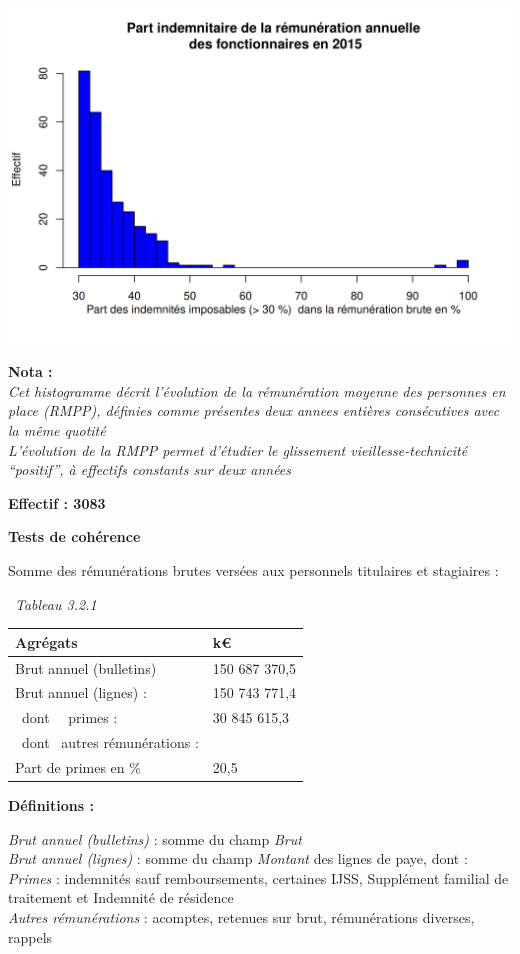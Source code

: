 \includegraphics{altair_files/figure-latex/unnamed-chunk-76-6.png}

\textbf{Nota :}\\
\emph{Cet histogramme décrit l'évolution de la rémunération moyenne des
personnes en place (RMPP), définies comme présentes deux annees entières
consécutives avec la même quotité}\\
\emph{L'évolution de la RMPP permet d'étudier le glissement
vieillesse-technicité ``positif'', à effectifs constants sur deux
années}

\textbf{Effectif : 3083 }

\textbf{Tests de cohérence}

Somme des rémunérations brutes versées aux personnels titulaires et
stagiaires :

~\emph{Tableau 3.2.1}

\begin{longtable}[]{@{}ll@{}}
\toprule
Agrégats & k€\tabularnewline
\midrule
\endhead
Brut annuel (bulletins) & 150 687 370,5\tabularnewline
Brut annuel (lignes) : & 150 743 771,4\tabularnewline
~dont ~~primes : & 30 845 615,3\tabularnewline
~dont ~autres rémunérations : &\tabularnewline
Part de primes en \% & 20,5\tabularnewline
\bottomrule
\end{longtable}

\textbf{Définitions :}

\emph{Brut annuel (bulletins)} : somme du champ \emph{Brut}\\
\emph{Brut annuel (lignes)} : somme du champ \emph{Montant} des lignes
de paye, dont :\\
\emph{Primes} : indemnités sauf remboursements, certaines IJSS,
Supplément familial de traitement et Indemnité de résidence\\
\emph{Autres rémunérations} : acomptes, retenues sur brut, rémunérations
diverses, rappels

